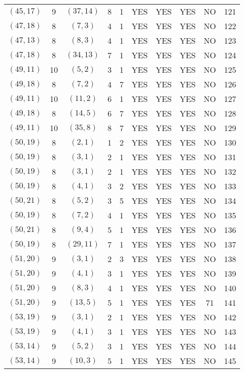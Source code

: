 \begin{longtable}{|c|c|c|c|c|c|c|c|c|c|}
$(45, 17)$ & 9 & $(37, 14)$ & 8 & 1 & YES & YES & YES & NO & 121\\
$(47, 18)$ & 8 & $(7, 3)$ & 4 & 1 & YES & YES & YES & NO & 122\\
$(47, 13)$ & 8 & $(8, 3)$ & 4 & 1 & YES & YES & YES & NO & 123\\
$(47, 18)$ & 8 & $(34, 13)$ & 7 & 1 & YES & YES & YES & NO & 124\\
$(49, 11)$ & 10 & $(5, 2)$ & 3 & 1 & YES & YES & YES & NO & 125\\
$(49, 18)$ & 8 & $(7, 2)$ & 4 & 7 & YES & YES & YES & NO & 126\\
$(49, 11)$ & 10 & $(11, 2)$ & 6 & 1 & YES & YES & YES & NO & 127\\
$(49, 18)$ & 8 & $(14, 5)$ & 6 & 7 & YES & YES & YES & NO & 128\\
$(49, 11)$ & 10 & $(35, 8)$ & 8 & 7 & YES & YES & YES & NO & 129\\
$(50, 19)$ & 8 & $(2, 1)$ & 1 & 2 & YES & YES & YES & NO & 130\\
$(50, 19)$ & 8 & $(3, 1)$ & 2 & 1 & YES & YES & YES & NO & 131\\
$(50, 19)$ & 8 & $(3, 1)$ & 2 & 1 & YES & YES & YES & NO & 132\\
$(50, 19)$ & 8 & $(4, 1)$ & 3 & 2 & YES & YES & YES & NO & 133\\
$(50, 21)$ & 8 & $(5, 2)$ & 3 & 5 & YES & YES & YES & NO & 134\\
$(50, 19)$ & 8 & $(7, 2)$ & 4 & 1 & YES & YES & YES & NO & 135\\
$(50, 21)$ & 8 & $(9, 4)$ & 5 & 1 & YES & YES & YES & NO & 136\\
$(50, 19)$ & 8 & $(29, 11)$ & 7 & 1 & YES & YES & YES & NO & 137\\
$(51, 20)$ & 9 & $(3, 1)$ & 2 & 3 & YES & YES & YES & NO & 138\\
$(51, 20)$ & 9 & $(4, 1)$ & 3 & 1 & YES & YES & YES & NO & 139\\
$(51, 20)$ & 9 & $(8, 3)$ & 4 & 1 & YES & YES & YES & NO & 140\\
$(51, 20)$ & 9 & $(13, 5)$ & 5 & 1 & YES & YES & YES & 71 & 141\\
$(53, 19)$ & 9 & $(3, 1)$ & 2 & 1 & YES & YES & YES & NO & 142\\
$(53, 19)$ & 9 & $(4, 1)$ & 3 & 1 & YES & YES & YES & NO & 143\\
$(53, 14)$ & 9 & $(5, 2)$ & 3 & 1 & YES & YES & YES & NO & 144\\
$(53, 14)$ & 9 & $(10, 3)$ & 5 & 1 & YES & YES & YES & NO & 145\\

\end{longtable}
